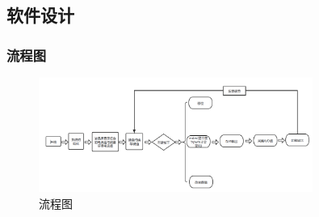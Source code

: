 \documentclass{../source/zjureport}
\begin{document}
        \subsection{软件设计}
            \subsubsection{流程图}

            \begin{figure}[thp]
                \centering
                \includegraphics[width = 0.8\textwidth]{figure/软件框图.png}
                \caption{流程图}
            \end{figure}
\end{document}
